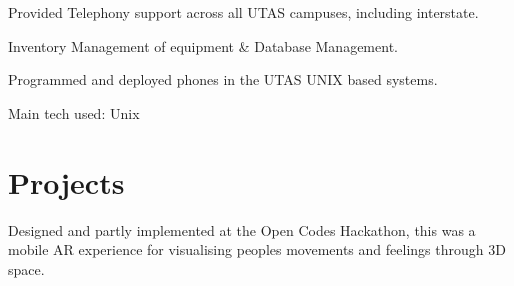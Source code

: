 \documentclass[a4paper]{deedy-resume} %
\begin{document}
\begin{minipage}[t]{0.66\textwidth}
\sectionspace %



\begin{tightitemize}
\item Provided Telephony support across all UTAS campuses, including interstate.
\item Inventory Management of equipment \& Database Management.
\item Programmed and deployed phones in the UTAS UNIX based systems.
\end{tightitemize}
Main tech used: \textbullet{} Unix

\sectionspace %



\section{Projects}


Designed and partly implemented at the Open Codes Hackathon, this was a mobile AR experience for visualising peoples movements and feelings through 3D space.


\end{minipage}
\end{document}
